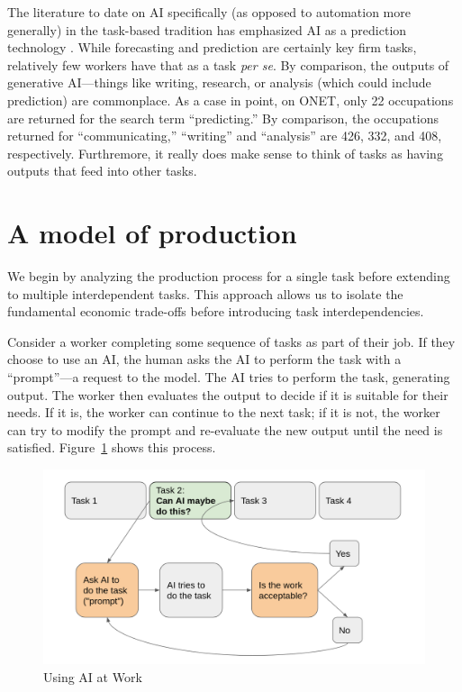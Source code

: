\documentclass{article}
\begin{document}
The literature to date on AI specifically (as opposed to automation more generally) in the task-based tradition has emphasized AI as a prediction technology \citep{agrawal2019}.
While forecasting and prediction are certainly key firm tasks, relatively few workers have that as a task \emph{per se}. 
By comparison, the outputs of generative AI---things like writing, research, or analysis (which could include prediction) are commonplace. 
As a case in point, on ONET, only 22 occupations are returned for the search term ``predicting.'' 
By comparison, the occupations returned for ``communicating,'' ``writing'' and ``analysis'' are 426, 332, and 408, respectively. 
Furthremore, it really does make sense to think of tasks as having outputs that feed into other tasks.

\section{A model of production}

We begin by analyzing the production process for a single task before extending to multiple interdependent tasks.
This approach allows us to isolate the fundamental economic trade-offs before introducing task interdependencies.

Consider a worker completing some sequence of tasks as part of their job.
If they choose to use an AI, the human asks the AI to perform the task with a ``prompt''---a request to the model. 
The AI tries to perform the task, generating output.
The worker then evaluates the output to decide if it is suitable for their needs. 
If it is, the worker can continue to the next task; 
if it is not, the worker can try to modify the prompt and re-evaluate the new output until the need is satisfied. 
Figure~\ref{fig:flow} shows this process.

\begin{figure}
  \caption{Using AI at Work} \label{fig:flow}
  \includegraphics[width = \textwidth]{images/flow.png}
\end{figure}
\end{document}
